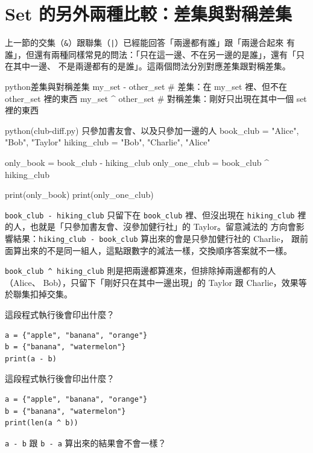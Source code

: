 \section{Set 的另外兩種比較：差集與對稱差集}
\label{sec:set-diff}

上一節的交集（\texttt{\&}）跟聯集（\texttt{|}）已經能回答「兩邊都有誰」跟「兩邊合起來
有誰」，但還有兩種同樣常見的問法：「只在這一邊、不在另一邊的是誰」，還有「只在其中一邊、
不是兩邊都有的是誰」。這兩個問法分別對應差集跟對稱差集。

\begin{code}{python}{差集與對稱差集}
my_set - other_set   # 差集：在 my_set 裡、但不在 other_set 裡的東西
my_set ^ other_set    # 對稱差集：剛好只出現在其中一個 set 裡的東西
\end{code}

\begin{example}{python}{(club-diff.py) 只參加書友會、以及只參加一邊的人}
book_club = {"Alice", "Bob", "Taylor"}
hiking_club = {"Bob", "Charlie", "Alice"}

only_book = book_club - hiking_club
only_one_club = book_club ^ hiking_club

print(only_book)
print(only_one_club)
\end{example}


\texttt{book\_club - hiking\_club} 只留下在 \texttt{book\_club} 裡、但沒出現在
\texttt{hiking\_club} 裡的人，也就是「只參加書友會、沒參加健行社」的 Taylor。留意減法的
方向會影響結果：\texttt{hiking\_club - book\_club} 算出來的會是只參加健行社的 Charlie，
跟前面算出來的不是同一組人，這點跟數字的減法一樣，交換順序答案就不一樣。

\texttt{book\_club \^{} hiking\_club} 則是把兩邊都算進來，但排除掉兩邊都有的人（Alice、
Bob），只留下「剛好只在其中一邊出現」的 Taylor 跟 Charlie，效果等於聯集扣掉交集。

\begin{drills}[label=drills:set-diff]
\item 這段程式執行後會印出什麼？
\begin{verbatim}
a = {"apple", "banana", "orange"}
b = {"banana", "watermelon"}
print(a - b)
\end{verbatim}
\item 這段程式執行後會印出什麼？
\begin{verbatim}
a = {"apple", "banana", "orange"}
b = {"banana", "watermelon"}
print(len(a ^ b))
\end{verbatim}
\item \texttt{a - b} 跟 \texttt{b - a} 算出來的結果會不會一樣？
\end{drills}

